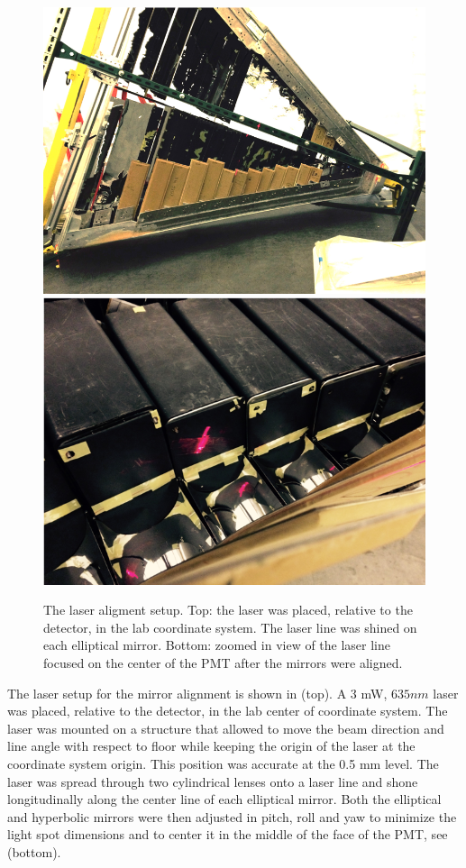 \begin{figure}
\centering
	\includegraphics[width=0.95\columnwidth, keepaspectratio]{img/laserAlignment1.png}
	\includegraphics[width=0.95\columnwidth, keepaspectratio]{img/laserAlignment2.png}
\caption{The laser aligment setup. Top: the laser was placed, relative to the detector, in the lab coordinate system. The laser line was shined on each elliptical mirror.
         Bottom: zoomed in view of the laser line focused on the center of the PMT after the mirrors were aligned.}
	\label{fig:laserAlignment}
\end{figure}

The laser setup for the mirror alignment is shown in  (top). A 3 mW, $635 nm$ laser was placed, relative to the detector,
in the lab center of coordinate system. The laser was mounted on a structure that allowed to move the beam direction and line angle with respect to floor while keeping
the origin of the laser at the coordinate system origin.
This position was accurate at the 0.5 mm level. The laser was spread through two cylindrical lenses onto a laser line and shone
longitudinally along the center line of each elliptical mirror. Both the elliptical and hyperbolic mirrors were then adjusted in pitch, roll and yaw to minimize the light spot
dimensions and to center it in the middle of the face of the PMT, see   (bottom).

